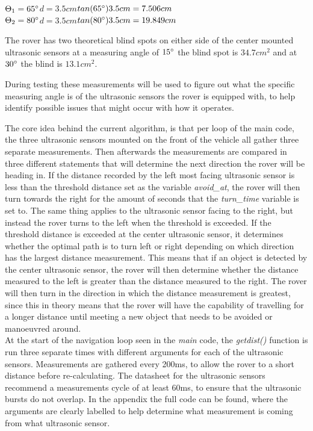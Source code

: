 $\Theta_1 = 65\degree$\quad\quad$d = 3.5cm$\quad\quad$tan(65\degree)3.5cm =  7.506cm$\\
$\Theta_2 = 80\degree$\quad\quad$d = 3.5cm$\quad\quad$tan(80\degree)3.5cm =  19.849cm$

The rover has two theoretical blind spots on either side of the center mounted ultrasonic sensors at a measuring angle of $15\degree$ the blind spot is $34.7cm^2$ and at $30\degree$ the blind is $13.1cm^2$. 

During testing these measurements will be used to figure out what the specific measuring angle is of the ultrasonic sensors the rover is equipped with, to help identify possible issues that might occur with how it operates.

\clearpage


The core idea behind the current algorithm, is that per loop of the main code, the three ultrasonic sensors mounted on the front of the vehicle all gather three separate measurements. Then afterwards the measurements are compared in three different statements that will determine the next direction the rover will be heading in. If the distance recorded by the left most facing ultrasonic sensor is less than the threshold distance set as the variable \textit{avoid\_at}, the rover will then turn towards the right for the amount of seconds that the \textit{turn\_time} variable is set to. The same thing applies to the ultrasonic sensor facing to the right, but instead the rover turns to the left when the threshold is exceeded.
If the threshold distance is exceeded at the center ultrasonic sensor, it determines whether the optimal path is to turn left or right depending on which direction has the largest distance measurement. This means that if an object is detected by the center ultrasonic sensor, the rover will then determine whether the distance measured to the left is greater than the distance measured to the right. The rover will then turn in the direction in which the distance measurement is greatest, since this in theory means that the rover will have the capability of travelling for a longer distance until meeting a new object that needs to be avoided or manoeuvred around.\\




At the start of the navigation loop seen in the \textit{main} code, the \textit{getdist()} function is run three separate times with different arguments for each of the ultrasonic sensors. Measurements are gathered every 200ms, to allow the rover to a short distance before re-calculating. The datasheet for the ultrasonic sensors recommend a measurements cycle of at least 60ms, to ensure that the ultrasonic bursts do not overlap. In the appendix the full code can be found, where the arguments are clearly labelled to help determine what measurement is coming from what ultrasonic sensor.
